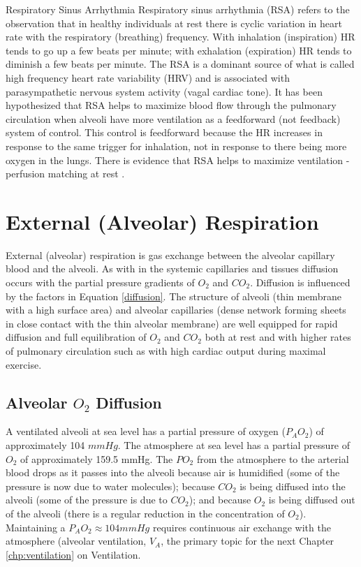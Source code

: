 \begin{warning}{Respiratory Sinus Arrhythmia}
    Respiratory sinus arrhythmia (RSA) refers to the observation that in healthy individuals at rest there is cyclic variation in heart rate with the respiratory (breathing) frequency. With inhalation (inspiration) HR tends to go up a few beats per minute; with exhalation (expiration) HR tends to diminish a few beats per minute. The RSA is a dominant source of what is called high frequency heart rate variability (HRV) and is associated with parasympathetic nervous system activity (vagal cardiac tone). It has been hypothesized that RSA helps to maximize blood flow through the pulmonary circulation when alveoli have more ventilation as a feedforward (not feedback) system of control. This control is feedforward because the HR increases in response to the same trigger for inhalation, not in response to there being more oxygen in the lungs. There is evidence that RSA helps to maximize ventilation - perfusion matching at rest \cite{hayano_hypothesis_2003}.
\end{warning}


\section{External (Alveolar) Respiration}

External (alveolar) respiration is gas exchange between the alveolar capillary blood and the alveoli. As with in the systemic capillaries and tissues diffusion occurs with the partial pressure gradients of $O_2$ and $CO_2$. Diffusion is influenced by the factors in Equation \ref{diffusion}. The structure of alveoli (thin membrane with a high surface area) and alveolar capillaries (dense network forming sheets in close contact with the thin alveolar membrane) are well equipped for rapid diffusion and full equilibration of $O_2$ and $CO_2$ both at rest and with higher rates of pulmonary circulation such as with high cardiac output during maximal exercise.


\subsection{Alveolar $O_2$ Diffusion}

A ventilated alveoli at sea level has a partial pressure of oxygen ($P_AO_2$) of approximately 104 $mmHg$. The atmosphere at sea level has a partial pressure of $O_2$ of approximately 159.5 mmHg. The $PO_2$ from the atmosphere to the arterial blood drops as it passes into the alveoli because air is humidified (some of the pressure is now due to water molecules); because $CO_2$ is being diffused into the alveoli (some of the pressure is due to $CO_2$); and because $O_2$ is being diffused out of the alveoli (there is a regular reduction in the concentration of $O_2$). Maintaining a $P_AO_2 \approx 104 mmHg$ requires continuous air exchange with the atmosphere (alveolar ventilation, $V_A$, the primary topic for the next Chapter \ref{chp:ventilation} on Ventilation.

